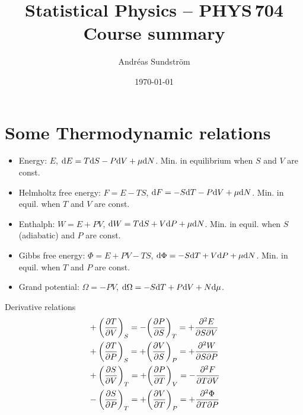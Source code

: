 \documentclass[11pt,letter, swedish, english, twocolumn
]{article}
\begin{document}




\title{Statistical Physics -- PHYS\,704 \\
Course summary}
\author{Andréas Sundström}
\date{\today}

\maketitle


\section{Some Thermodynamic relations}

\begin{itemize}
\item Energy: $E$, $\mathrm{d} E = T\mathrm{d} S - P\mathrm{d} V + \mu\mathrm{d} N$.
Min. in equilibrium when $S$ and $V$ are const.
\item Helmholtz free energy: $F=E-TS$, $\mathrm{d} F = -S\mathrm{d} T - P\mathrm{d} V + \mu\mathrm{d} N$.
Min. in equil. when $T$ and $V$ are const.
\item Enthalph: $W=E+PV$, $\mathrm{d} W = T\mathrm{d} S + V\mathrm{d} P + \mu\mathrm{d} N$.
Min. in equil. when $S$ (adiabatic) and $P$ are const.
\item Gibbs free energy: $\Phi=E+PV-TS$, $\mathrm{d}\Phi = -S\mathrm{d} T + V\mathrm{d} P + \mu\mathrm{d} N$.
Min. in equil. when $T$ and $P$ are const.
\item Grand potential: $\Omega=-PV$, $\mathrm{d}\Omega = -S\mathrm{d} T + P\mathrm{d} V + N\mathrm{d}\mu$.
\end{itemize}

Derivative relations
\begin{equation}
\begin{aligned}
&+\qty(\pdv{T}{V})_S=-\qty(\pdv{P}{S})_T=+\pdv[2]{E}{S}{V}\\
&+\qty(\pdv{T}{P})_S=+\qty(\pdv{V}{S})_P=+\pdv[2]{W}{S}{P}\\
&+\qty(\pdv{S}{V})_T=+\qty(\pdv{P}{T})_V=-\pdv[2]{F}{T}{V}\\
&-\qty(\pdv{S}{P})_T=+\qty(\pdv{V}{T})_P=+\pdv[2]{\Phi}{T}{P}\\
\end{aligned}
\end{equation}
\end{document}
